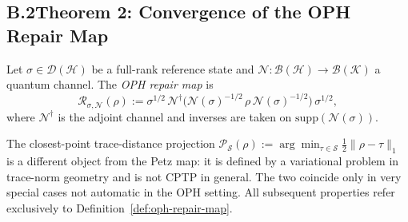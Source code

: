 \subsection*{B.2\quad Theorem 2: Convergence of the OPH Repair Map}

\begin{definition}
\label{def:oph-repair-map}
Let $\sigma\in\mathcal{D}(\mathcal{H})$ be a full-rank reference state and
$\mathcal{N}:\mathcal{B}(\mathcal{H})\to\mathcal{B}(\mathcal{K})$ a quantum channel.
The \emph{OPH repair map} is
\[
  \mathcal{R}_{\sigma,\mathcal{N}}(\rho)
  := \sigma^{1/2}\,
     \mathcal{N}^\dagger\!\bigl(
       \mathcal{N}(\sigma)^{-1/2}\,\rho\,\mathcal{N}(\sigma)^{-1/2}
     \bigr)
     \,\sigma^{1/2},
\]
where $\mathcal{N}^\dagger$ is the adjoint channel and inverses are
taken on $\mathrm{supp}(\mathcal{N}(\sigma))$.
\end{definition}

\begin{remark}
The closest-point trace-distance projection
$\mathcal{P}_{\mathcal{S}}(\rho):=\arg\min_{\tau\in\mathcal{S}}\tfrac12\|\rho-\tau\|_1$
is a different object from the Petz map: it is defined by a variational
problem in trace-norm geometry and is not \textrm{CPTP} in general.
The two coincide only in very special cases not automatic in the
\textrm{OPH} setting.
All subsequent properties refer exclusively to
Definition~\ref{def:oph-repair-map}.
\end{remark}

